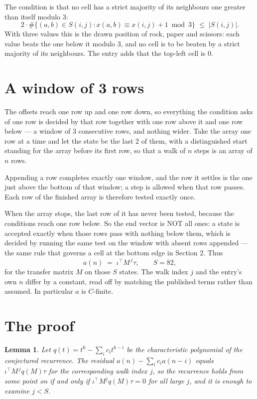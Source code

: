 \documentclass[11pt,a4paper]{article}
\theoremstyle{plain}
\newtheorem{lemma}[theorem]{Lemma}
\theoremstyle{definition}
\begin{document}
The condition is that no cell has a strict majority of its neighbours one greater than itself modulo $3$:
\[
2\cdot\#\{(a,b)\in S(i,j) : x(a,b)\equiv x(i,j)+1 \bmod 3\}\;\le\;|S(i,j)| .
\]
With three values this is the drawn position of rock, paper and scissors: each value beats the one below it modulo $3$, and no cell is to be beaten by a strict majority of its neighbours. The entry adds that the top-left cell is $0$.

\section{A window of 3 rows}

The offsets reach one row up and one row down, so everything the condition asks of one row is
decided by that row together with one row above it and one row below --- a window of
$3$ consecutive rows, and nothing wider. Take the array one row at a time
and let the state be the last 2 of them, with a distinguished start standing for the
array before its first row, so that a walk of $n$ steps is an array of $n$ rows.

Appending a row completes exactly one window, and the row it settles is the one just above the bottom of that window; a step is
allowed when that row passes. Each row of the finished
array is therefore tested exactly once.

When the array stops, the last row of it has never been tested, because the
conditions reach one row below. So the end vector is NOT all ones: a state is accepted exactly when
those rows pass with nothing below them, which is decided by running the same test on the window
with absent rows appended --- the same rule that governs a cell at the bottom edge in
Section 2.
Thus
\[
a(n)\;=\;\iota^{\!\top}M^{\,j}\tau ,\qquad S=82,
\]
for the transfer matrix $M$ on those $S$ states. The walk index $j$ and the entry's own $n$
differ by a constant, read off by matching the published terms rather than assumed. In
particular $a$ is $C$-finite.

\section{The proof}

\begin{lemma}\label{lem:crit}
Let $q(t)=t^{6}-\sum_i c_it^{6-i}$ be the characteristic polynomial of the
conjectured recurrence. The residual $a(n)-\sum_ic_ia(n-i)$ equals
$\iota^{\!\top}M^{\,j}q(M)\tau$ for the corresponding walk index $j$, so the recurrence
holds from some point on if and only if $\iota^{\!\top}M^{j}q(M)\tau=0$ for all large $j$,
and it is enough to examine $j<S$.
\end{lemma}
\end{document}
